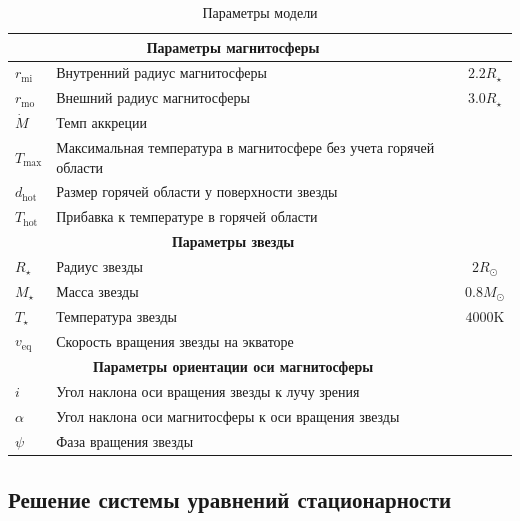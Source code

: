 \documentclass{article}
\begin{document}
\begin{table}[hb]
\centering
\begin{tabular}[c]{|l l c|}
	\multicolumn{2}{c}{\textbf{Параметры магнитосферы}} \\
	\hline
	$r_\text{mi}$ & Внутренний радиус магнитосферы & $2.2 R_\star$\\
	\hline
	$r_\text{mo}$ & Внешний радиус магнитосферы & $3.0 R_\star$\\
	\hline
	$\dot{M}$ & Темп аккреции & \\
	\hline
	$T_\text{max}$ & Максимальная температура в магнитосфере без учета горячей области & \\
	\hline
	$d_\text{hot}$ & Размер горячей области у поверхности звезды & \\
	\hline
	$T_\text{hot}$ & Прибавка к температуре в горячей области & \\
	\hline
	\multicolumn{2}{c}{\textbf{Параметры звезды}} \\
	\hline
	$R_\star $ & Радиус звезды & $2 R_\odot$ \\
	\hline
	$M_\star $ & Масса звезды & $0.8 M_\odot$ \\
	\hline
	$T_\star $ & Температура звезды & $4000\text{K} $ \\
	\hline
	$v_\text{eq}$ & Скорость вращения звезды на экваторе & \\
	\hline
	\multicolumn{2}{c}{\textbf{Параметры ориентации оси магнитосферы}} \\
	\hline
	$i$ & Угол наклона оси вращения звезды к лучу зрения & \\
	\hline
	$\alpha$ & Угол наклона оси магнитосферы к оси вращения звезды & \\
	\hline
	$\psi$ & Фаза вращения звезды & \\
	\hline
\end{tabular}
\caption{Параметры модели}
\label{tab:par}
\end{table}

\subsection{Решение системы уравнений стационарности}
\end{document}
